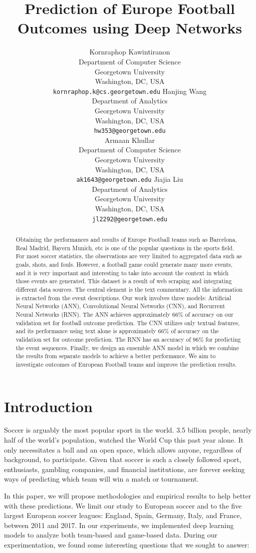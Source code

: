 \documentclass[11pt,a4paper]{article}
\title{Prediction of Europe Football Outcomes using Deep Networks}
\author{Kornraphop Kawintiranon \\
  Department of Computer Science \\
  Georgetown University \\
  Washington, DC, USA \\
  {\tt kornraphop.k@cs.georgetown.edu} \And
  Hanjing Wang \\
  Department of Analytics \\
  Georgetown University \\
  Washington, DC, USA \\
  {\tt hw353@georgetown.edu}\\\AND
  Armaan Khullar \\
  Department of Computer Science \\
  Georgetown University \\
  Washington, DC, USA \\
  {\tt ak1643@georgetown.edu} \And
  Jiajia Liu \\
  Department of Analytics \\
  Georgetown University \\
  Washington, DC, USA \\
  {\tt jl2292@georgetown.edu} \\}
\date{}
\begin{document}
\maketitle
\begin{abstract}
Obtaining the performances and results of Europe Football teams such as Barcelona, Real Madrid, Bayern Munich, etc is one of the popular questions in the sports field. For most soccer statistics, the observations are very limited to aggregated data such as goals, shots, and fouls. However, a football game could generate many more events, and it is very important and interesting to take into account the context in which those events are generated. This dataset is a result of web scraping and integrating different data sources. The central element is the text commentary. All the information is extracted from the event descriptions. Our work involves three models: Artificial Neural Networks (ANN), Convolutional Neural Networks (CNN), and Recurrent Neural Networks (RNN). The ANN achieves approximately 66\% of accuracy on our validation set for football outcome prediction. The CNN utilizes only textual features, and its performance using text alone is approximately 66\% of accuracy on the validation set for outcome prediction. The RNN has an accuracy of 96\% for predicting the event sequences. Finally, we design an ensemble ANN model in which we combine the results from separate models to achieve a better performance. We aim to investigate outcomes of European Football teams and improve the prediction results.

\end{abstract}


\section{Introduction}

Soccer is arguably the most popular sport in the world. 3.5 billion people, nearly half of the world’s population, watched the World Cup this past year alone.  It only necessitates a ball and an open space, which allows anyone, regardless of background, to participate. Given that soccer is such a closely followed sport, enthusiasts, gambling companies, and financial institutions, are forever seeking ways of predicting which team will win a match or tournament.

In this paper, we will propose methodologies and empirical results to help better with these predictions. We limit our study to European soccer and to the five largest European soccer leagues: England, Spain, Germany, Italy, and France, between 2011 and 2017. In our experiments, we implemented deep learning models to analyze both team-based and game-based data. During our experimentation, we found some interesting questions that we sought to answer:
\end{document}
